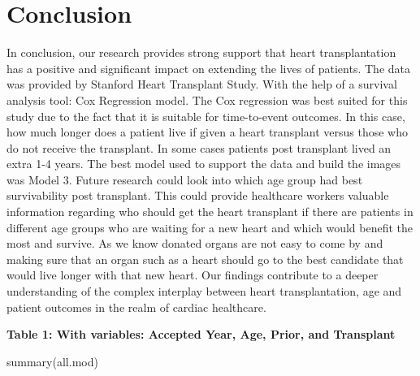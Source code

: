 \documentclass[
  letterpaper,
  DIV=11,
  numbers=noendperiod]{scrreprt}
\newenvironment{Shaded}{\begin{snugshade}}{\end{snugshade}}
\newcommand{\FunctionTok}[1]{\textcolor[rgb]{0.28,0.35,0.67}{#1}}
\newcommand{\NormalTok}[1]{\textcolor[rgb]{0.00,0.23,0.31}{#1}}
\begin{document}
\hypertarget{conclusion}{%
\chapter{Conclusion}\label{conclusion}}

In conclusion, our research provides strong support that heart
transplantation has a positive and significant impact on extending the
lives of patients. The data was provided by Stanford Heart Transplant
Study. With the help of a survival analysis tool: Cox Regression model.
The Cox regression was best suited for this study due to the fact that
it is suitable for time-to-event outcomes. In this case, how much longer
does a patient live if given a heart transplant versus those who do not
receive the transplant. In some cases patients post transplant lived an
extra 1-4 years. The best model used to support the data and build the
images was Model 3. Future research could look into which age group had
best survivability post transplant. This could provide healthcare
workers valuable information regarding who should get the heart
transplant if there are patients in different age groups who are waiting
for a new heart and which would benefit the most and survive. As we know
donated organs are not easy to come by and making sure that an organ
such as a heart should go to the best candidate that would live longer
with that new heart. Our findings contribute to a deeper understanding
of the complex interplay between heart transplantation, age and patient
outcomes in the realm of cardiac healthcare.

\textbf{Table 1: With variables: Accepted Year, Age, Prior, and Transplant}

\begin{Shaded}
\begin{Highlighting}[]
\FunctionTok{summary}\NormalTok{(all.mod)}
\end{Highlighting}
\end{Shaded}
\end{document}
